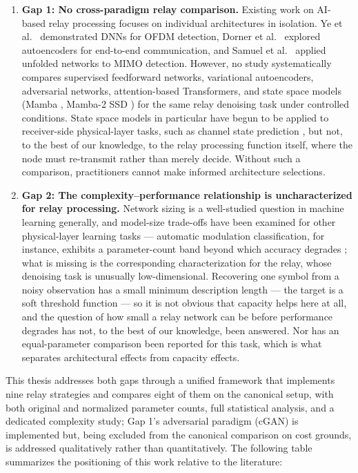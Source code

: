 \begin{enumerate}
    \item \textbf{Gap 1: No cross-paradigm relay comparison.} Existing work on AI-based relay processing focuses on individual architectures in isolation. Ye et al.~\cite{YeLiJuang2018OFDMDL} demonstrated DNNs for OFDM detection, Dorner et al.~\cite{Dorner2018OverTheAirDL} explored autoencoders for end-to-end communication, and Samuel et al.~\cite{SamuelDiskinWunder2019MIMODetect} applied unfolded networks to MIMO detection. However, no study systematically compares supervised feedforward networks, variational autoencoders, adversarial networks, attention-based Transformers, and state space models (Mamba \cite{gu2023mamba}, Mamba-2 SSD \cite{DaoGu2024TransformersSSM}) for the same relay denoising task under controlled conditions. State space models in particular have begun to be applied to receiver-side physical-layer tasks, such as channel state prediction \cite{Djuhera2026MambaCSP}, but not, to the best of our knowledge, to the relay processing function itself, where the node must re-transmit rather than merely decide. Without such a comparison, practitioners cannot make informed architecture selections.
    \item \textbf{Gap 2: The complexity--performance relationship is uncharacterized for relay processing.} Network sizing is a well-studied question in machine learning generally, and model-size trade-offs have been examined for other physical-layer learning tasks --- automatic modulation classification, for instance, exhibits a parameter-count band beyond which accuracy degrades \cite{Harper2023AMCDeepNets}; what is missing is the corresponding characterization for the relay, whose denoising task is unusually low-dimensional. Recovering one symbol from a noisy observation has a small minimum description length --- the target is a soft threshold function --- so it is not obvious that capacity helps here at all, and the question of how small a relay network can be before performance degrades has not, to the best of our knowledge, been answered. Nor has an equal-parameter comparison been reported for this task, which is what separates architectural effects from capacity effects.

\end{enumerate}

This thesis addresses both gaps through a unified framework that implements nine relay strategies and compares eight of them on the canonical setup, with both original and normalized parameter counts, full statistical analysis, and a dedicated complexity study; Gap 1's adversarial paradigm (cGAN) is implemented but, being excluded from the canonical comparison on cost grounds, is addressed qualitatively rather than quantitatively. The following table summarizes the positioning of this work relative to the literature:

